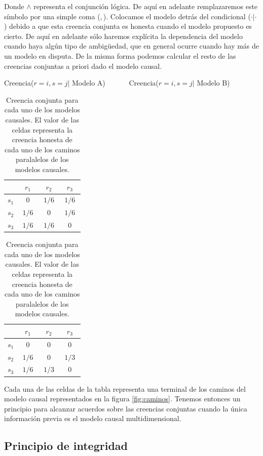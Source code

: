 \documentclass[a4paper,10pt]{book}
\theoremstyle{definition}
\begin{document}
%
Donde $\wedge$ representa el conjunción lógica.
%
De aquí en adelante remplazaremos este símbolo por una simple coma ($,$).
%
Colocamos el modelo detrás del condicional ($\cdot|\cdot$) debido a que esta creencia conjunta es honesta cuando el modelo propuesto es cierto.
%
De aquí en adelante sólo haremos explícita la dependencia del modelo cuando haya algún tipo de ambigüedad, que en general ocurre cuando hay más de un modelo en disputa.
%
De la misma forma podemos calcular el resto de las creencias conjuntas a priori dado el modelo causal.
%
\begin{table}[H]
\centering
Creencia($r=i, s=j |$  Modelo A) \ \ \ \ \ \ Creencia($r=i, s=j |$  Modelo B) \\[0.1cm]
 \begin{tabular}{|c|c|c|c|} \hline \setlength\tabcolsep{0.4cm}
       & \, $r_1$ \, &  \, $r_2$ \, & \, $r_3$ \, \\ \hline 
  $s_1$ & $0$ & $1/6$ & $1/6$  \\ \hline
  $s_2$ & $1/6$ & $0$ & $1/6$  \\ \hline
  $s_3$ & $1/6$ & $1/6$ & $0$ \\ \hline 
  \end{tabular}
  \hspace{1.5cm}
  \begin{tabular}{|c|c|c|c|} \hline  \setlength\tabcolsep{0.4cm} 
 & \, $r_1$ \, &  \, $r_2$ \, & \, $r_3$ \,  \\ \hline 
  $s_1$ & $0$ & $0$ & $0$ \\ \hline
  $s_2$ & $1/6$ & $0$ & $1/3$ \\ \hline
  $s_3$ & $1/6$ & $1/3$ & $0$  \\ \hline  
  \end{tabular}
  \caption{Creencia conjunta para cada uno de los modelos causales. El valor de las celdas representa la creencia honesta de cada uno de los caminos paralalelos de los modelos causales. }
  \label{tab:creencia_conjunta}
\end{table}
%
Cada una de las celdas de la tabla representa una terminal de los caminos del modelo causal representados en la figura \ref{fig:caminos}.
Tenemos entonces un principio para alcanzar acuerdos sobre las creencias conjuntas cuando la única información previa es el modelo causal multidimensional.


\subsection{Principio de integridad}
\end{document}
